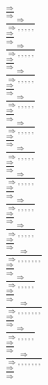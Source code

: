 \documentclass[11pt]{article}
\begin{document}
\begin{center}
\bigskip
\\$\frac{\Rightarrow }{\Rightarrow }$
\bigskip
\\$\frac{\Rightarrow }{\Rightarrow , , , , , }$
\bigskip
\\$\frac{\Rightarrow }{\Rightarrow }$
\bigskip
\\$\frac{\Rightarrow }{\Rightarrow , , , , , }$
\bigskip
\\$\frac{\Rightarrow }{\Rightarrow }$
\bigskip
\\$\frac{\Rightarrow }{\Rightarrow , , , , , }$
\bigskip
\\$\frac{\Rightarrow }{\Rightarrow }$
\bigskip
\\$\frac{\Rightarrow }{\Rightarrow , , , , , }$
\bigskip
\\$\frac{\Rightarrow }{\Rightarrow }$
\bigskip
\\$\frac{\Rightarrow }{\Rightarrow , , , , , }$
\bigskip
\\$\frac{\Rightarrow }{\Rightarrow }$
\bigskip
\\$\frac{\Rightarrow }{\Rightarrow , , , , , }$
\bigskip
\\$\frac{\Rightarrow }{\Rightarrow }$
\bigskip
\\$\frac{\Rightarrow }{\Rightarrow , , , , , }$
\bigskip
\\$\frac{\Rightarrow }{\Rightarrow }$
\bigskip
\\$\frac{\Rightarrow }{\Rightarrow , , , , , }$
\bigskip
\\$\frac{\Rightarrow }{\Rightarrow }$
\bigskip
\\$\frac{\Rightarrow }{\Rightarrow , , , , , }$
\bigskip
\\$\frac{\Rightarrow }{\Rightarrow }$
\bigskip
\\$\frac{\Rightarrow }{\Rightarrow , , , , , , , }$
\bigskip
\\$\frac{\Rightarrow }{\Rightarrow }$
\bigskip
\\$\frac{\Rightarrow }{\Rightarrow , , , , , }$
\bigskip
\\$\frac{\Rightarrow }{\Rightarrow }$
\bigskip
\\$\frac{\Rightarrow }{\Rightarrow , , , , , , , }$
\bigskip
\\$\frac{\Rightarrow }{\Rightarrow }$
\bigskip
\\$\frac{\Rightarrow }{\Rightarrow , , , , , }$
\bigskip
\\$\frac{\Rightarrow }{\Rightarrow }$
\bigskip
\\$\frac{\Rightarrow }{\Rightarrow , , , , , , , }$
\bigskip
\\$\frac{\Rightarrow }{\Rightarrow }$

\end{center}
\end{document}
